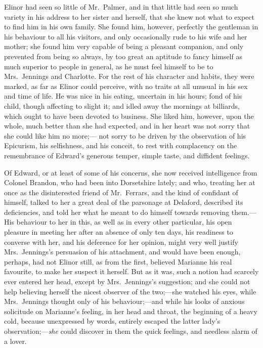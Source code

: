 Elinor had seen so little of Mr.\ Palmer, and in that
little had seen so much variety in his address to her
sister and herself, that she knew not what to expect
to find him in his own family.  She found him, however,
perfectly the gentleman in his behaviour to all his visitors,
and only occasionally rude to his wife and her mother;
she found him very capable of being a pleasant companion,
and only prevented from being so always, by too great
an aptitude to fancy himself as much superior to people
in general, as he must feel himself to be to Mrs.\ Jennings
and Charlotte.  For the rest of his character and habits,
they were marked, as far as Elinor could perceive,
with no traits at all unusual in his sex and time of life.
He was nice in his eating, uncertain in his hours;
fond of his child, though affecting to slight it;
and idled away the mornings at billiards, which ought
to have been devoted to business.  She liked him, however,
upon the whole, much better than she had expected, and in
her heart was not sorry that she could like him no more;---%
not sorry to be driven by the observation of his Epicurism,
his selfishness, and his conceit, to rest with complacency
on the remembrance of Edward's generous temper, simple taste,
and diffident feelings.

Of Edward, or at least of some of his concerns,
she now received intelligence from Colonel Brandon,
who had been into Dorsetshire lately; and who,
treating her at once as the disinterested friend
of Mr.\ Ferrars, and the kind of confidant of himself,
talked to her a great deal of the parsonage at Delaford,
described its deficiencies, and told her what he meant
to do himself towards removing them.---His behaviour
to her in this, as well as in every other particular,
his open pleasure in meeting her after an absence
of only ten days, his readiness to converse with her,
and his deference for her opinion, might very well
justify Mrs.\ Jennings's persuasion of his attachment,
and would have been enough, perhaps, had not Elinor still,
as from the first, believed Marianne his real favourite,
to make her suspect it herself.  But as it was,
such a notion had scarcely ever entered her head,
except by Mrs.\ Jennings's suggestion; and she could
not help believing herself the nicest observer of the
two;---she watched his eyes, while Mrs.\ Jennings thought
only of his behaviour;---and while his looks of anxious
solicitude on Marianne's feeling, in her head and throat,
the beginning of a heavy cold, because unexpressed by words,
entirely escaped the latter lady's observation;---\emph{she} could
discover in them the quick feelings, and needless alarm
of a lover.

